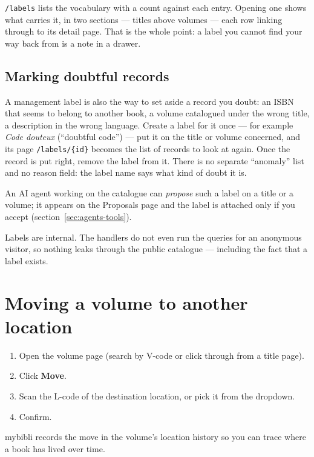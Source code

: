 \texttt{/labels} lists the vocabulary with a count against each entry.
Opening one shows what carries it, in two sections --- titles above
volumes --- each row linking through to its detail page. That is the
whole point: a label you cannot find your way back from is a note in a
drawer.

\subsection*{Marking doubtful records}

A management label is also the way to set aside a record you doubt:
an ISBN that seems to belong to another book, a volume catalogued
under the wrong title, a description in the wrong language. Create a
label for it once --- for example \emph{Code douteux} (``doubtful
code'') --- put it on the title or volume concerned, and its page
\texttt{/labels/\{id\}} becomes the list of records to look at again.
Once the record is put right, remove the label from it. There is no
separate ``anomaly'' list and no reason field: the label name says
what kind of doubt it is.

An AI agent working on the catalogue can \emph{propose} such a label
on a title or a volume; it appears on the Proposals page and the label
is attached only if you accept (section~\ref{sec:agents-tools}).

\begin{note}
Labels are internal. The handlers do not even run the queries for an
anonymous visitor, so nothing leaks through the public catalogue ---
including the fact that a label exists.
\end{note}

\section{Moving a volume to another location}\label{sec:move-volume}

\begin{enumerate}
  \item Open the volume page (search by V-code or click through from
        a title page).
  \item Click \textbf{Move}.
  \item Scan the L-code of the destination location, or pick it
        from the dropdown.
  \item Confirm.
\end{enumerate}

mybibli records the move in the volume's location history so you can
trace where a book has lived over time.

